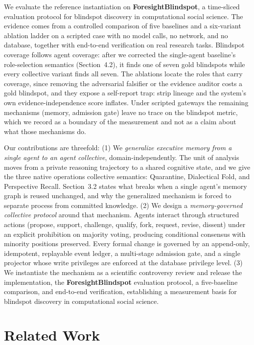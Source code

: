 We evaluate the reference instantiation on \textbf{ForesightBlindspot}, a
time-sliced evaluation protocol for blindspot discovery in computational social
science. The evidence comes from a controlled comparison of five baselines and
a six-variant ablation ladder on a scripted case with no model calls, no
network, and no database, together with end-to-end verification on real
research tasks. Blindspot coverage follows agent coverage: after we corrected
the single-agent baseline's role-selection semantics (Section~4.2), it finds
one of seven gold blindspots while every collective variant finds all seven.
The ablations locate the roles that carry coverage, since removing the
adversarial falsifier or the evidence auditor costs a gold blindspot, and they
expose a self-report trap: strip lineage and the system's own
evidence-independence score inflates. Under scripted gateways the remaining
mechanisms (memory, admission gate) leave no trace on the blindspot metric,
which we record as a boundary of the measurement and not as a claim about what
those mechanisms do.

Our contributions are threefold:
(1) We \emph{generalize executive memory from a single agent to an agent
collective}, domain-independently. The unit of analysis moves from a private
reasoning trajectory to a shared cognitive state, and we give the three native
operations collective semantics: Quarantine, Dialectical Fold, and Perspective
Recall. Section~3.2 states what breaks when a single agent's memory graph is
reused unchanged, and why the generalized mechanism is forced to separate
process from committed knowledge.
(2) We design a \emph{memory-governed collective protocol} around that
mechanism. Agents interact through structured actions (propose, support,
challenge, qualify, fork, request, revise, dissent) under an explicit
prohibition on majority voting, producing conditional consensus with minority
positions preserved. Every formal change is governed by an append-only,
idempotent, replayable event ledger, a multi-stage admission gate, and a single
projector whose write privileges are enforced at the database privilege level.
(3) We instantiate the mechanism as a scientific controversy review and release
the implementation, the \textbf{ForesightBlindspot} evaluation protocol, a
five-baseline comparison, and end-to-end verification, establishing a
measurement basis for blindspot discovery in computational social science.

\section{Related Work}

